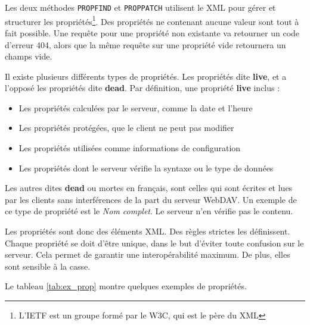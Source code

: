 \documentclass[a4paper, 11pt]{article}
\begin{document}
{		Les deux méthodes \texttt{PROPFIND} et \texttt{PROPPATCH} utilisent le XML pour gérer et structurer les propriétés\footnote{L'IETF est un groupe formé par le W3C, qui est le père du XML}. Des propriétés ne contenant aucune valeur sont tout à fait possible. Une requête pour une propriété non existante va retourner un code d'erreur 404, alors que la même requête sur une propriété vide retournera un champs vide. 
		
		Il existe plusieurs différents types de propriétés. Les propriétés dite \textbf{live}, et a l'opposé les propriétés dite \textbf{dead}. Par définition, une propriété \textbf{live} inclus : 
		
		\begin{itemize}
			\item Les propriétés calculées par le serveur, comme la date et l'heure
			\item Les propriétés protégées, que le client ne peut pas modifier
			\item Les propriétés utilisées comme informations de configuration
			\item Les propriétés dont le serveur vérifie la syntaxe ou le type de données
		\end{itemize}
		
		Les autres dites \textbf{dead} ou mortes en français, sont celles qui sont écrites et lues par les clients sans interférences de la part du serveur WebDAV. Un exemple de ce type de propriété est le \emph{Nom complet}. Le serveur n'en vérifie pas le contenu.
		
		
		Les propriétés sont donc des éléments XML. Des règles strictes les définissent. Chaque propriété se doit d'être unique, dans le but d'éviter toute confusion sur le serveur. Cela permet de garantir une interopérabilité maximum. De plus, elles sont sensible à la casse.
		
		Le tableau \ref{tab:ex_prop} montre quelques exemples de propriétés.
		
}
\end{document}
